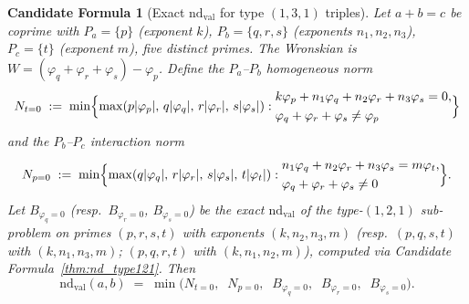 \documentclass[12pt]{article}
\newtheorem{candidate}{Candidate Formula}
\theoremstyle{definition}
\begin{document}
\begin{candidate}[Exact $\mathrm{nd}_{\mathrm{val}}$ for type $(1,3,1)$ triples]\label{thm:nd_type131}
  Let $a + b = c$ be coprime with $P_a = \{p\}$ (exponent $k$),
  $P_b = \{q, r, s\}$ (exponents $n_1, n_2, n_3$), $P_c = \{t\}$ (exponent $m$),
  five distinct primes.  The Wronskian is $W = (\varphi_q+\varphi_r+\varphi_s)-\varphi_p$.
  Define the \emph{$P_a$--$P_b$ homogeneous norm}
  \[
    N_{t=0} \;:=\; \min\Bigl\{
      \max(p|\varphi_p|,\,q|\varphi_q|,\,r|\varphi_r|,\,s|\varphi_s|) :
      \begin{aligned}
        &k\varphi_p + n_1\varphi_q + n_2\varphi_r + n_3\varphi_s = 0,\\
        &\varphi_q + \varphi_r + \varphi_s \ne \varphi_p
      \end{aligned}
    \Bigr\}
  \]
  and the \emph{$P_b$--$P_c$ interaction norm}
  \[
    N_{p=0} \;:=\; \min\Bigl\{
      \max(q|\varphi_q|,\,r|\varphi_r|,\,s|\varphi_s|,\,t|\varphi_t|) :
      \begin{aligned}
        &n_1\varphi_q + n_2\varphi_r + n_3\varphi_s = m\varphi_t,\\
        &\varphi_q + \varphi_r + \varphi_s \ne 0
      \end{aligned}
    \Bigr\}.
  \]
  Let $B_{\varphi_q=0}$ (resp.\ $B_{\varphi_r=0}$, $B_{\varphi_s=0}$) be the exact
  $\mathrm{nd}_{\mathrm{val}}$ of the type-$(1,2,1)$ sub-problem on primes $(p,r,s,t)$ with exponents
  $(k,n_2,n_3,m)$ (resp.\ $(p,q,s,t)$ with $(k,n_1,n_3,m)$; $(p,q,r,t)$ with
  $(k,n_1,n_2,m)$), computed via Candidate Formula~\ref{thm:nd_type121}.  Then
  \[
    \mathrm{nd}_{\mathrm{val}}(a,b) \;=\; \min\!\bigl(
      N_{t=0},\;\;
      N_{p=0},\;\;
      B_{\varphi_q=0},\;\;
      B_{\varphi_r=0},\;\;
      B_{\varphi_s=0}
    \bigr).
  \]
\end{candidate}
\end{document}

